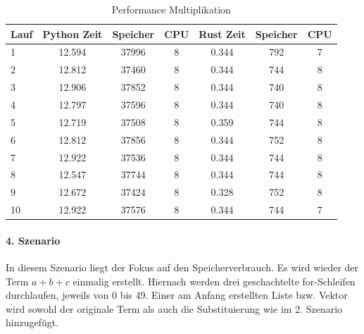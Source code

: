 \documentclass[11pt,a4paper, ngerman]{article}
\begin{document}
\begin{table}[ht!]
    \caption{Performance Multiplikation}
    \centering
    \begin{tabular}{|l|c|c|c|c|c|c|}
        \hline
        \textbf{Lauf} & \textbf{Python Zeit} & \textbf{Speicher} & \textbf{CPU} & \textbf{Rust Zeit} & \textbf{Speicher} & \textbf{CPU} \\
        \hline
        1 & 12.594 & 37996 & 8 & 0.344 & 792 & 7 \\
        \hline
        2 & 12.812 & 37460 & 8 & 0.344 & 744 & 8 \\
        \hline
        3 & 12.906 & 37852 & 8 & 0.344 & 740 & 8 \\
        \hline
        4 & 12.797 & 37596 & 8 & 0.344 & 740 & 8 \\
        \hline
        5 & 12.719 & 37508 & 8 & 0.359 & 744 & 8 \\
        \hline
        6 & 12.812 & 37856 & 8 & 0.344 & 752 & 8 \\
        \hline
        7 & 12.922 & 37536 & 8 & 0.344 & 744 & 8 \\
        \hline
        8 & 12.547 & 37744 & 8 & 0.344 & 744 & 8 \\
        \hline
        9 & 12.672 & 37424 & 8 & 0.328 & 752 & 8 \\
        \hline
        10 & 12.922 & 37576 & 8 & 0.344 & 744 & 7 \\
        \hline
    \end{tabular}
\end{table}

\paragraph{4. Szenario} In diesem Szenario liegt der Fokus auf den Speicherverbrauch. Es wird wieder der Term $a+b+c$ einmalig erstellt. Hiernach werden drei geschachtelte for-Schleifen durchlaufen, jeweils von 0 bis 49. Einer am Anfang erstellten Liste bzw. Vektor wird sowohl der originale Term als auch die Substituierung wie im 2. Szenario hinzugefügt.
\end{document}
